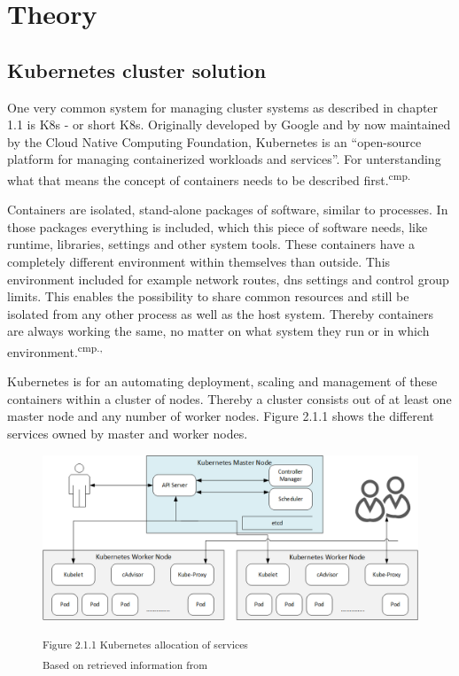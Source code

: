 \chapter{Theory}

\section{Kubernetes cluster solution}

One very common system for managing cluster systems as described in chapter 1.1 is \acl{K8s} - or short \acs{K8s}. Originally developed by Google and by now maintained by the Cloud Native Computing Foundation, Kubernetes is an ``open-source platform for managing containerized workloads and services''. For unterstanding what that means the concept of containers needs to be described first.\textsuperscript{cmp.\cite{12}}


Containers are isolated, stand-alone packages of software, similar to processes. In those packages everything is included, which this piece of software needs, like runtime, libraries, settings and other system tools.  These containers have a completely different environment within themselves than outside. This environment included for example network routes, dns settings and control group limits. This enables the possibility to share common resources and still be isolated from any other process as well as the host system. Thereby containers are always working the same, no matter on what system they run or in which environment.\textsuperscript{cmp.\cite{13}, \cite{14}}


Kubernetes is for an automating deployment, scaling and management of these containers within a cluster of nodes. Thereby a cluster consists out of at least one master node and any number of worker nodes. Figure 2.1.1 shows the different services owned by master and worker nodes.

\begin{figure}[h]
\centering
\includegraphics[width=\textwidth/5*3]{images/kubernetes_service_allocation.png}

\textsuperscript{Figure 2.1.1 Kubernetes allocation of services}\\
\textsuperscript{Based on retrieved information from \cite{13}}
\end{figure}

